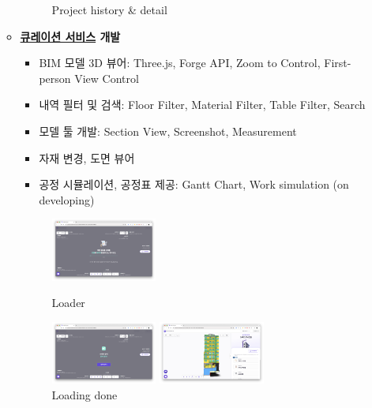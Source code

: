 \begin{itemize}[label=]
\begin{itemize}[label=]
\begin{figure}[!ht]
\begin{fullwidth}
{					            \caption*{Project history \& detail}
				            }
			            \end{fullwidth}
		            \end{figure}
		            \clearpage
		      \item \textbf{\href{https://curation.builderhub.io/project/tester}{큐레이션 서비스} 개발}
		            \begin{itemize}
			            \item BIM 모델 3D 뷰어: Three.js, Forge API, Zoom to Control, First-person View Control
			            \item 내역 필터 및 검색: Floor Filter, Material Filter, Table Filter, Search
			            \item 모델 툴 개발: Section View, Screenshot, Measurement
			            \item 자재 변경, 도면 뷰어
			            \item 공정 시뮬레이션, 공정표 제공: Gantt Chart, Work simulation (on developing)
		            \end{itemize}
		            \begin{figure}[!ht]
			            \begin{fullwidth}
				            \parbox{0.35\textwidth}{
					            \centering
					            \includegraphics[width=0.35\textwidth]{images/builderhub-curation-loader-1.png}
					            \caption*{Loader}
				            }\qquad
				            \parbox{0.35\textwidth}{
					            \centering
					            \includegraphics[width=0.35\textwidth]{images/builderhub-curation-loader-2.png}
					            \caption*{Loading done}
				            }\qquad
				            \parbox{0.35\textwidth}{
					            \centering
					            \includegraphics[width=0.35\textwidth]{images/builderhub-curation-main.png}
}
\end{fullwidth}
\end{figure}
\end{itemize}
\end{itemize}

